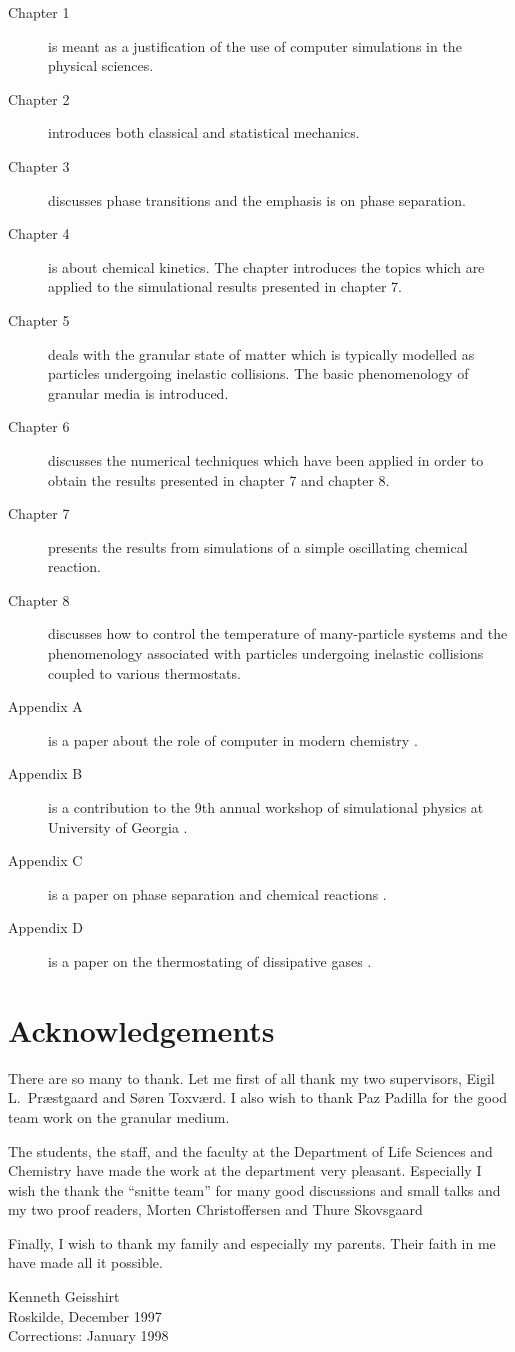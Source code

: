 \begin{description}
\item[Chapter 1] is meant as a justification of the use of computer
  simulations in the physical sciences.
\item[Chapter 2] introduces both classical and statistical mechanics.
\item[Chapter 3] discusses phase transitions and the emphasis is on
  phase separation.
\item[Chapter 4] is about chemical kinetics. The chapter introduces the
  topics which are applied to the simulational results
  presented in chapter 7.
\item[Chapter 5] deals with the granular state of matter which is
  typically modelled as particles undergoing inelastic collisions. The
  basic phenomenology of granular media is introduced.
\item[Chapter 6] discusses the numerical techniques which have been
  applied in order to obtain the results presented in chapter 7 and
  chapter 8.
\item[Chapter 7] presents the results from simulations of a simple
  oscillating chemical reaction.
\item[Chapter 8] discusses how to control the temperature of many-particle
  systems and the phenomenology associated with particles
  undergoing inelastic collisions coupled to various thermostats.
\item[Appendix A] is a paper about the role of computer in modern
  chemistry \cite{Geisshirt96b}.
\item[Appendix B] is a contribution to the 9th annual workshop of
  simulational physics at University of Georgia \cite{Geisshirt96a}.
\item[Appendix C] is a paper on phase separation and chemical reactions
  \cite{Geisshirt97a}.
\item[Appendix D] is a paper on the thermostating of dissipative gases
  \cite{Geisshirt97b}.
\end{description}


\section*{Acknowledgements}
There are so many to thank. Let me first of all thank my two
supervisors, Eigil L.\ Pr{\ae}stgaard and S{\o}ren Toxv{\ae}rd. I also
wish to thank Paz Padilla for the good team work on the granular medium.

The students, the staff, and the faculty at the Department of Life
Sciences and Chemistry have made the work at the department very
pleasant. Especially I wish the thank the ``snitte team'' for many good
discussions and small talks and my two proof readers, Morten Christoffersen
and Thure Skovsgaard

Finally, I wish to thank my family and especially my parents. Their
faith in me have made all it possible.

\vspace{1.5cm}
\begin{flushright}
  Kenneth Geisshirt \\
  Roskilde, December 1997 \\
  \footnotesize{Corrections: January 1998}
\end{flushright}
